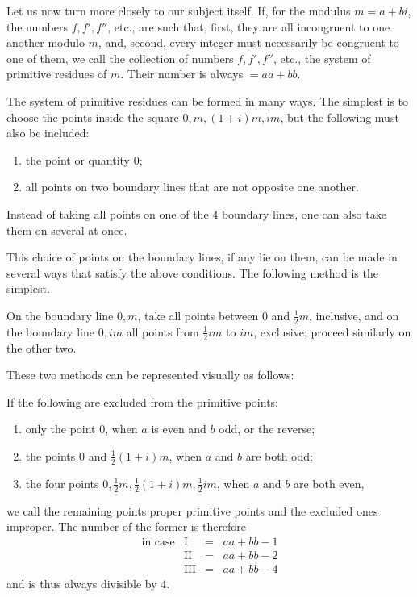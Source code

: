 Let us now turn more closely to our subject itself. If, for the modulus $m=a+bi$, the numbers $f,f',f''$, etc., are such that, first, they are all incongruent to one another modulo $m$, and, second, every integer must necessarily be congruent to one of them, we call the
collection of numbers $f,f',f''$, etc., the system of primitive residues of $m$. Their number is always $=aa+bb$.

The system of primitive residues can be formed in many ways. The simplest is to choose the points inside the square $0,m,(1+i)m,im$, but the following must also be included:
\begin{enumerate}
\item[I.] the point or quantity $0$;
\item[II.] all points on two boundary lines that are not opposite one another.
\end{enumerate}
Instead of taking all points on one of the $4$ boundary lines, one can also take them on several at once.

This choice of points on the boundary lines, if any lie on them, can be made in several ways that satisfy the above conditions. The following method is the simplest.

On the boundary line $0,m$, take all points between $0$ and $\frac12m$, inclusive, and on the boundary line $0,im$ all points from $\frac12im$ to $im$, exclusive; proceed similarly on the other two.

These two methods can be represented visually as follows:
\begin{center}\resizebox{.85\textwidth}{!}{}\end{center}

If the following are excluded from the primitive points:
\begin{enumerate}
\item[I.] only the point $0$, when $a$ is even and $b$ odd, or the reverse;
\item[II.] the points $0$ and $\frac12(1+i)m$, when $a$ and $b$ are both odd;
\item[III.] the four points $0,\frac12m,\frac12(1+i)m,\frac12im$, when $a$ and $b$ are both even,
\end{enumerate}
we call the remaining points proper primitive points and the excluded ones improper. The number of the former is therefore
\[
\begin{array}{rrcl}
\text{in case}&\mathrm{I}&=&aa+bb-1\\
&\mathrm{II}&=&aa+bb-2\\
&\mathrm{III}&=&aa+bb-4
\end{array}
\]
and is thus always divisible by $4$.

